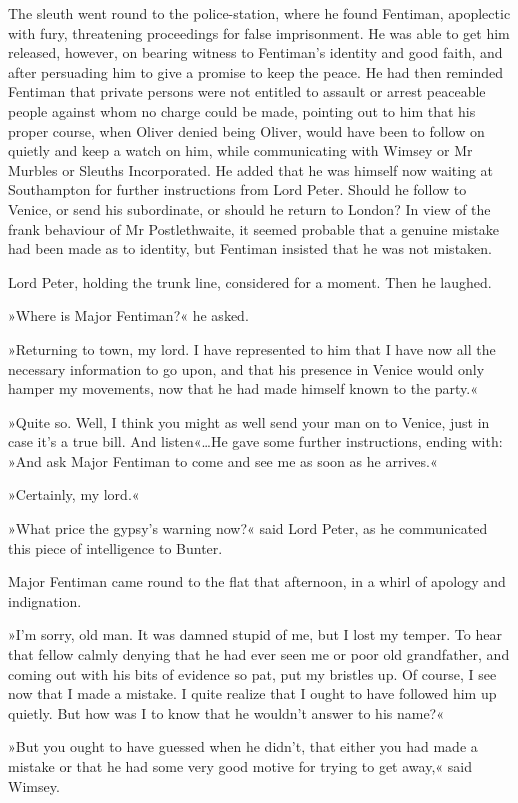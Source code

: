 The sleuth went round to the police-station, where he found Fentiman, apoplectic with fury, threatening proceedings for false imprisonment. He was able to get him released, however, on bearing witness to Fentiman's identity and good faith, and after persuading him to give a promise to keep the peace. He had then reminded Fentiman that private persons were not entitled to assault or arrest peaceable people against whom no charge could be made, pointing out to him that his proper course, when Oliver denied being Oliver, would have been to follow on quietly and keep a watch on him, while communicating with Wimsey or Mr Murbles or Sleuths Incorporated. He added that he was himself now waiting at Southampton for further instructions from Lord Peter. Should he follow to Venice, or send his subordinate, or should he return to London? In view of the frank behaviour of Mr Postlethwaite, it seemed probable that a genuine mistake had been made as to identity, but Fentiman insisted that he was not mistaken.

Lord Peter, holding the trunk line, considered for a moment. Then he laughed.

»Where is Major Fentiman?« he asked.

»Returning to town, my lord. I have represented to him that I have now all the necessary information to go upon, and that his presence in Venice would only hamper my movements, now that he had made himself known to the party.«

»Quite so. Well, I think you might as well send your man on to Venice, just in case it's a true bill. And listen«\dots He gave some further instructions, ending with: »And ask Major Fentiman to come and see me as soon as he arrives.«

»Certainly, my lord.«

»What price the gypsy's warning now?« said Lord Peter, as he communicated this piece of intelligence to Bunter.

Major Fentiman came round to the flat that afternoon, in a whirl of apology and indignation.

»I'm sorry, old man. It was damned stupid of me, but I lost my temper. To hear that fellow calmly denying that he had ever seen me or poor old grandfather, and coming out with his bits of evidence so pat, put my bristles up. Of course, I see now that I made a mistake. I quite realize that I ought to have followed him up quietly. But how was I to know that he wouldn't answer to his name?«

»But you ought to have guessed when he didn't, that either you had made a mistake or that he had some very good motive for trying to get away,« said Wimsey.


